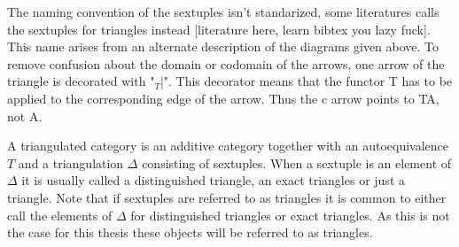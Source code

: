 \documentclass[12pt]{article}
\theoremstyle{definition}
\theoremstyle{remark}
\begin{document}
        The naming convention of the sextuples isn't standarized, some literatures calls the sextuples for triangles instead [literature here, learn bibtex you lazy fuck]. This name arises from an alternate description of the diagrams given above. To remove confusion about the domain or codomain of the arrows, one arrow of the triangle is decorated with "$_T$|". This decorator means that the functor T has to be applied to the corresponding edge of the arrow. Thus the c arrow points to TA, not A.

        \begin{center}
        \end{center}

        A triangulated category is an additive category together with an autoequivalence $T$ and a triangulation $\Delta$ consisting of sextuples. When a sextuple is an element of $\Delta$ it is usually called a distinguished triangle, an exact triangles or just a triangle. Note that if sextuples are referred to as triangles it is common to either call the elements of $\Delta$ for distinguished triangles or exact triangles. As this is not the case for this thesis these objects will be referred to as triangles.
\end{document}

